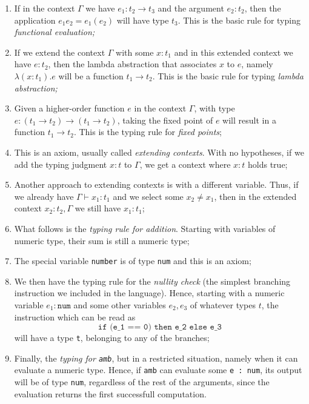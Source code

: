 \begin{enumerate}[(1)]
\item If in the context $ \Gamma $ we have $ e_1 : t_2 \to t_3 $ and
  the argument $ e_2 : t_2 $, then the application $ e_1 e_2 = e_1(e_2) $
  will have type $ t_3 $. This is the basic rule for typing \emph{functional %
  evaluation;}
\item If we extend the context $ \Gamma $ with some $ x : t_1 $ and in this
  extended context we have $ e : t_2 $, then the lambda abstraction that
  associates $ x $ to $ e $, namely $ \lambda (x : t_1) . e $ will
  be a function $ t_1 \to t_2 $. This is the basic rule for typing \emph{lambda %
  abstraction;}
\item Given a higher-order function $ e $ in the context $ \Gamma $, with
  type $ e : (t_1 \to t_2) \to (t_1 \to t_2) $, taking the fixed point of
  $ e $ will result in a function $ t_1 \to t_2 $. This is the typing rule
  for \emph{fixed points};
\item This is an axiom, usually called \emph{extending contexts}. With no
  hypotheses, if we add the typing judgment $ x : t $ to $ \Gamma $, we get
  a context where $ x : t $ holds true;
\item Another approach to extending contexts is with a different variable.
  Thus, if we already have $ \Gamma \vdash x_1 : t_1 $ and we select
  some $ x_2 \neq x_1 $, then in the extended context $ x_2 : t_2, \Gamma $
  we still have $ x_1 : t_1 $;
\item What follows is the \emph{typing rule for addition}. Starting with variables
  of numeric type, their sum is still a numeric type;
\item The special variable \texttt{number} is of type \texttt{num} and this
  is an axiom;
\item We then have the typing rule for the \emph{nullity check} (the simplest
  branching instruction we included in the language). Hence, starting with
  a numeric variable $ e_1 : \texttt{num} $ and some other variables $ e_2, e_3 $
  of whatever types $ t $, the instruction which can be read as
  \[
    \texttt{if (e\_1 == 0) then e\_2 else e\_3}
  \]
  will have a type \texttt{t}, belonging to any of the branches;
\item Finally, the \emph{typing for \texttt{amb}}, but in a restricted
  situation, namely when it can evaluate a numeric type. Hence, if
  \texttt{amb} can evaluate some \texttt{e : num}, its output will be of type
  \texttt{num}, regardless of the rest of the arguments, since the evaluation
  returns the first successfull computation.
\end{enumerate}

